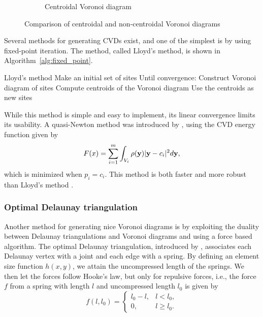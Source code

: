 \begin{figure}[ht]
\begin{subfigure}[b]{0.4\textwidth}
        \caption{Centroidal Voronoi diagram}
        \label{fig:CVD}
    \end{subfigure}
    \caption{Comparison of centroidal and non-centroidal Voronoi diagrams}
    \label{fig:CVD_comparison}
\end{figure}

Several methods for generating CVDs exist, and one of the simplest is by using fixed-point iteration. The method, called Lloyd's method, is shown in Algorithm~\ref{alg:fixed_point}.

\begin{pseudocode}[label=alg:fixed_point]{Lloyd's method}
    Make an initial set of sites
    Until convergence:
        Construct Voronoi diagram of sites
        Compute centroids of the Voronoi diagram
        Use the centroids as new sites
\end{pseudocode}

While this method is simple and easy to implement, its linear convergence limits its usability. A quasi-Newton method was introduced by \textcite{CVDmethods}, using the CVD energy function given by
\begin{equation}
    F(x) = \sum_{i=1}^m \int_{V_i} \rho(\mathbf{y}) \lvert\mathbf{y} - c_i\rvert^2 d\mathbf{y},
\end{equation}
which is minimized when $p_i = c_i$. This method is both faster and more robust than Lloyd's method \cite{CVDmethods}.

\subsubsection{Optimal Delaunay triangulation}
\label{sec:optimal-delaunay}
Another method for generating nice Voronoi diagrams is by exploiting the duality between Delaunay triangulations and Voronoi diagrams and using a force based algorithm. The optimal Delaunay triangulation, introduced by \textcite{Distmesh}, associates each Delaunay vertex with a joint and each edge with a spring. By defining an element size function $h(x, y)$, we attain the uncompressed length of the springs. We then let the forces follow Hooke's law, but only for repulsive forces, i.e., the force $f$ from a spring with length $l$ and uncompressed length $l_0$ is given by
\begin{equation}
    \label{eq:delaunay_force}
    f(l, l_0) = \begin{cases}
        l_0 - l, & l < l_0, \\
        0, & l \ge l_0.
    \end{cases}
\end{equation}

